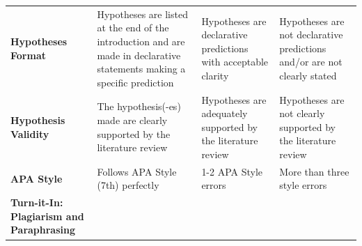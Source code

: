 \documentclass[
  openany]{book}
\begin{document}
\begin{longtable}[]{@{}llll@{}}
\begin{minipage}[t]{0.22\columnwidth}\raggedright
\textbf{Hypotheses Format}\strut
\end{minipage} & \begin{minipage}[t]{0.22\columnwidth}\raggedright
Hypotheses are listed at the end of the introduction and are made in declarative statements making a specific prediction\strut
\end{minipage} & \begin{minipage}[t]{0.22\columnwidth}\raggedright
Hypotheses are declarative predictions with acceptable clarity\strut
\end{minipage} & \begin{minipage}[t]{0.22\columnwidth}\raggedright
Hypotheses are not declarative predictions and/or are not clearly stated\strut
\end{minipage}\tabularnewline
\begin{minipage}[t]{0.22\columnwidth}\raggedright
\textbf{Hypothesis Validity}\strut
\end{minipage} & \begin{minipage}[t]{0.22\columnwidth}\raggedright
The hypothesis(-es) made are clearly supported by the literature review\strut
\end{minipage} & \begin{minipage}[t]{0.22\columnwidth}\raggedright
Hypotheses are adequately supported by the literature review\strut
\end{minipage} & \begin{minipage}[t]{0.22\columnwidth}\raggedright
Hypotheses are not clearly supported by the literature review\strut
\end{minipage}\tabularnewline
\begin{minipage}[t]{0.22\columnwidth}\raggedright
\textbf{APA Style}\strut
\end{minipage} & \begin{minipage}[t]{0.22\columnwidth}\raggedright
Follows APA Style (7th) perfectly\strut
\end{minipage} & \begin{minipage}[t]{0.22\columnwidth}\raggedright
1-2 APA Style errors\strut
\end{minipage} & \begin{minipage}[t]{0.22\columnwidth}\raggedright
More than three style errors\strut
\end{minipage}\tabularnewline
\begin{minipage}[t]{0.22\columnwidth}\raggedright
\textbf{Turn-it-In: Plagiarism and Paraphrasing}\strut

\end{minipage}
\end{longtable}
\end{document}
